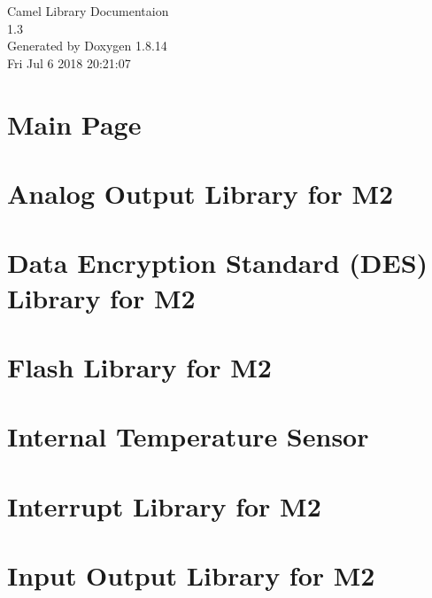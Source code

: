 \documentclass[twoside]{article}
\newcommand{\+}{\discretionary{\mbox{\scriptsize$\hookleftarrow$}}{}{}}
\begin{document}
\hypersetup{pageanchor=false,
             bookmarksnumbered=true,
             pdfencoding=unicode
            }
\begin{titlepage}
\vspace*{7cm}
\begin{center}%
{\Large Camel Library Documentaion \\[1ex]\large 1.\+3 }\\
\vspace*{1cm}
{\large Generated by Doxygen 1.8.14}\\
\vspace*{0.5cm}
{\small Fri Jul 6 2018 20:21:07}\\
\end{center}
\end{titlepage}
\tableofcontents
{}
\hypersetup{pageanchor=true}

\section{Main Page}
\label{index}\hypertarget{index}{}
\section{Analog Output Library for M2}
\label{a00139}

\section{Data Encryption Standard (D\+ES) Library for M2}
\label{a00140}

\section{Flash Library for M2}
\label{a00141}

\section{Internal Temperature Sensor}
\label{a00142}

\section{Interrupt Library for M2}
\label{a00143}

\section{Input Output Library for M2}
\label{a00144}

\end{document}
